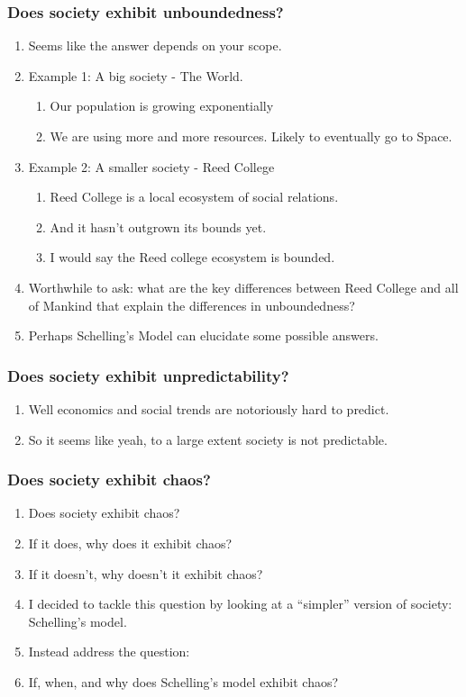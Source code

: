 \documentclass[11pt, handout]{beamer}
\begin{document}
\begin{frame}
    \frametitle{Does society exhibit unboundedness?}
    \begin{enumerate}
        \item Seems like the answer depends on your scope.
        \item Example 1: A big society - The World.
            \begin{enumerate}
                \item Our population is growing exponentially
                \item We are using more and more resources. Likely to eventually go to Space.
            \end{enumerate}
        \item Example 2: A smaller society - Reed College
            \begin{enumerate}
                \item Reed College is a local ecosystem of social relations.
                \item And it hasn't outgrown its bounds yet. 
                \item I would say the Reed college ecosystem is bounded.
            \end{enumerate}
        \item Worthwhile to ask: what are the key differences between Reed College and all of Mankind that explain the differences in unboundedness?
        \item Perhaps Schelling's Model can elucidate some possible answers.
    \end{enumerate}
\end{frame}

\begin{frame}
    \frametitle{Does society exhibit unpredictability?}
    \begin{enumerate}
        \item Well economics and social trends are notoriously hard to predict. 
        \item So it seems like yeah, to a large extent society is not predictable.
    \end{enumerate}
\end{frame}

\begin{frame}
    \frametitle{Does society exhibit chaos?}
    \begin{enumerate}
        \item {\color{blue} Does society exhibit chaos?}
        \item If it does, why does it exhibit chaos?
        \item If it doesn't, why doesn't it exhibit chaos?
        \item I decided to tackle this question by looking at a ``simpler'' version of society: Schelling's model.
        \item Instead address the question: 
    \item {\color{blue} If, when, and why does Schelling's model exhibit chaos? }
    \end{enumerate}


\end{frame}
\end{document}
